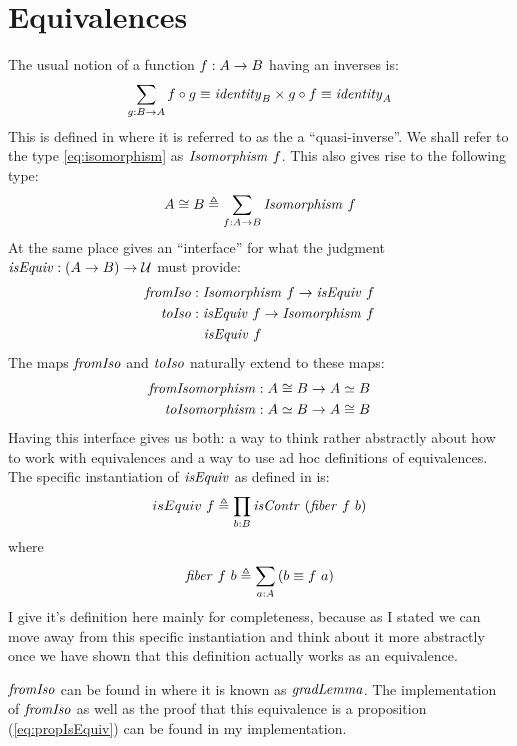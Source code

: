 \section{Equivalences}
\label{sec:equiv}
The usual notion of a function $f \mathrel{:} A \to B$ having an inverses is:
%
\begin{equation}
\label{eq:isomorphism}
\sum_{g \mathrel{:} B \to A} f \circ g \equiv \mathit{identity}_{B} \times g \circ f \equiv \mathit{identity}_{A}
\end{equation}
%
This is defined in \cite[p. 129]{hott-2013} where it is referred to as the a
``quasi-inverse''. We shall refer to the type \ref{eq:isomorphism} as
$\mathit{Isomorphism}\ f$. This also gives rise to the following type:
%
\begin{equation}
A \cong B \mathrel{\triangleq} \sum_{f \mathrel{:} A \to B} \mathit{Isomorphism}\ f
\end{equation}
%
At the same place \cite{hott-2013} gives an ``interface'' for what the judgment
$\mathit{isEquiv} \mathrel{:} (A \to B) \to \mathcal{U}$ must provide:
%
\begin{align}
\mathit{fromIso}   & \mathrel{:} \mathit{Isomorphism}\ f \to \mathit{isEquiv}\ f \\
\mathit{toIso}     & \mathrel{:} \mathit{isEquiv}\ f \to \mathit{Isomorphism}\ f \\
\label{eq:propIsEquiv}
                &\mathrel{\ } \mathit{isEquiv}\ f
\end{align}
%
The maps $\mathit{fromIso}$ and $\mathit{toIso}$ naturally extend to these maps:
%
\begin{align}
\mathit{fromIsomorphism} & \mathrel{:} A \cong B \to A \simeq B \\
\mathit{toIsomorphism}   & \mathrel{:} A \simeq B \to A \cong B
\end{align}
%
Having this interface gives us both: a way to think rather abstractly about how
to work with equivalences and a way to use ad hoc definitions of equivalences.
The specific instantiation of $\mathit{isEquiv}$ as defined in \cite{cubical-agda} is:
%
$$
isEquiv\ f \defeq \prod_{b \tp B} \isContr\ (\fiber\ f\ b)
$$
where
$$
\mathit{fiber}\ f\ b \mathrel{\triangleq} \sum_{a \mathrel{:} A} \left( b \equiv f\ a \right)
$$
%
I give it's definition here mainly for completeness, because as I stated we can
move away from this specific instantiation and think about it more abstractly
once we have shown that this definition actually works as an equivalence.

$\mathit{fromIso}$ can be found in \cite{cubical-agda} where it is known as
$\mathit{gradLemma}$. The implementation of $\mathit{fromIso}$ as well as the proof
that this equivalence is a proposition (\ref{eq:propIsEquiv}) can be found in my
implementation.

